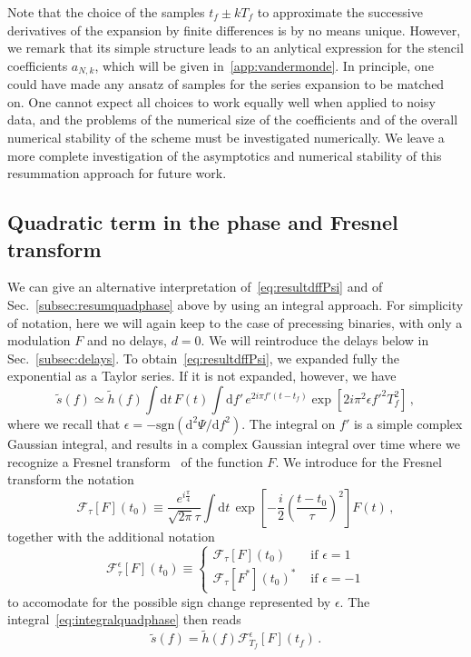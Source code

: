 \documentclass[aps,showpacs,%
prd,superscriptaddress,nofootinbib]{revtex4}
\newcommand{\be}{\begin{equation}}
\newcommand{\ee}{\end{equation}}
\newcommand\ud{{\mathrm{d}}}
\newcommand\calF{{\mathcal{F}}}
\newcommand{\tf}{t_{f}}
\newcommand{\Tf}{T_{f}}
\begin{document}
Note that the choice of the samples $\tf \pm k\Tf$ to approximate the successive derivatives of the expansion by finite differences is by no means unique. However, we remark that its simple structure leads to an anlytical expression for the stencil coefficients $a_{N,k}$, which will be given in~\ref{app:vandermonde}. In principle, one could have made any ansatz of samples for the series expansion to be matched on. One cannot expect all choices to work equally well when applied to noisy data, and the problems of the numerical size of the coefficients and of the overall numerical stability of the scheme must be investigated numerically. We leave a more complete investigation of the asymptotics and numerical stability of this resummation approach for future work.


\subsection{Quadratic term in the phase and Fresnel transform}
\label{subsec:fresneltransform}

We can give an alternative interpretation of~\eqref{eq:resultdffPsi} and of Sec.~\ref{subsec:resumquadphase} above by using an integral approach. For simplicity of notation, here we will again keep to the case of precessing binaries, with only a modulation $F$ and no delays, $d=0$. We will reintroduce the delays below in Sec.~\ref{subsec:delays}. To obtain~\eqref{eq:resultdffPsi}, we expanded fully the exponential as a Taylor series. If it is not expanded, however, we have
\be\label{eq:integralquadphase}
	\tilde{s}(f)	\simeq \tilde{h}(f) \int \ud t\, F(t) \int\ud f'\, e^{2i\pi f' (t-\tf)} \exp\left[ 2i\pi^{2} \epsilon{f'}^{2} \Tf^{2} \right] \,,
\ee
where we recall that $\epsilon = -\mathrm{sgn}(\ud ^{2} \Psi/\ud f^{2})$. The integral on $f'$ is a simple complex Gaussian integral, and results in a complex Gaussian integral over time where we recognize a Fresnel transform~\cite{} of the function $F$. We introduce for the Fresnel transform the notation
\be\label{eq:defFresnel}
	\calF_{\tau}[F](t_{0}) \equiv \frac{e^{i\frac{\pi}{4}}}{\sqrt{2\pi} \tau} \int \ud t \, \exp\left[ - \frac{i}{2} \left( \frac{t-t_{0}}{\tau} \right)^{2}\right] F(t) \,,
\ee
together with the additional notation
\be\label{eq:Fresnelsign}
	\calF^{\epsilon}_{\tau}[F](t_{0}) \equiv
\begin{cases}
	 \calF_{\tau}[F](t_{0}) &\text{ if } \epsilon=1 \\
	 \calF_{\tau}[F^{*}](t_{0})^{*} &\text{ if } \epsilon=-1
\end{cases}
\ee
to accomodate for the possible sign change represented by $\epsilon$. The integral~\eqref{eq:integralquadphase} then reads
\be\label{eq:resultFresnel}
	\tilde{s}(f) = \tilde{h}(f) \calF^{\epsilon}_{\Tf}[F](\tf) \,.
\ee
\end{document}
